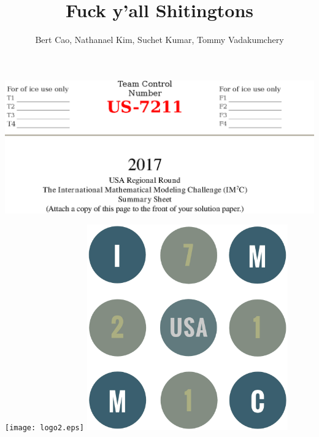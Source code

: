 \documentclass[letterpaper]{article}
\title{Fuck y'all Shitingtons}
\author{Bert Cao, Nathanael Kim, Suchet Kumar, Tommy Vadakumchery}
\begin{document}
	\begin{center}
		\includegraphics[width=\textwidth]{summary.eps}
	\end{center}
		
	\newpage
	\begin{center}
		\texttt{[image: logo2.eps]}
		\includegraphics[width=0.65\textwidth]{love.eps}
	\end{center}


	\newpage
	\tableofcontents
	\newpage

	
	
	
	
	
	
\end{document}
